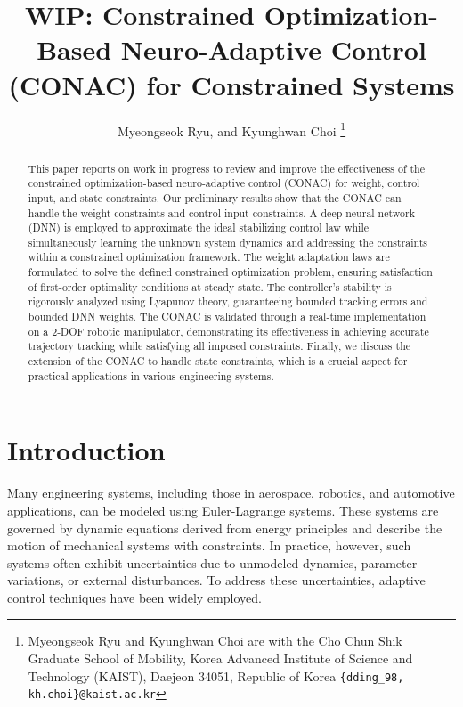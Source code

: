 \documentclass[letterpaper, 10 pt, conference]{ieeeconf}  %
\title{\LARGE \bf
    WIP: Constrained Optimization-Based Neuro-Adaptive Control (CONAC) for Constrained Systems
}
\author{Myeongseok Ryu, and Kyunghwan Choi%
    \thanks{
        Myeongseok Ryu and Kyunghwan Choi are with the Cho Chun Shik Graduate School of Mobility, Korea Advanced Institute of Science and Technology (KAIST), Daejeon 34051, Republic of Korea {\tt\small \{dding\_98, kh.choi\}@kaist.ac.kr}
    }%
}
\begin{document}
\maketitle
\thispagestyle{empty}
\pagestyle{empty}

\begin{abstract}
    This paper reports on work in progress to review and improve the effectiveness of the constrained optimization-based neuro-adaptive control (CONAC) for weight, control input, and state constraints.
    Our preliminary results show that the CONAC can handle the weight constraints and control input constraints.
  A deep neural network (DNN) is employed to approximate the ideal stabilizing control law while simultaneously learning the unknown system dynamics and addressing the constraints within a constrained optimization framework.
  The weight adaptation laws are formulated to solve the defined constrained optimization problem, ensuring satisfaction of first-order optimality conditions at steady state.
  The controller's stability is rigorously analyzed using Lyapunov theory, guaranteeing bounded tracking errors and bounded DNN weights. 
  The CONAC is validated through a real-time implementation on a 2-DOF robotic manipulator, demonstrating its effectiveness in achieving accurate trajectory tracking while satisfying all imposed constraints.
  Finally, we discuss the extension of the CONAC to handle state constraints, which is a crucial aspect for practical applications in various engineering systems.
\end{abstract}

\section{Introduction}


Many engineering systems, including those in aerospace, robotics, and automotive applications, can be modeled using Euler-Lagrange systems. 
These systems are governed by dynamic equations derived from energy principles and describe the motion of mechanical systems with constraints. 
In practice, however, such systems often exhibit uncertainties due to unmodeled dynamics, parameter variations, or external disturbances. 
To address these uncertainties, adaptive control techniques have been widely employed.
\end{document}
